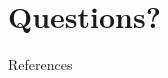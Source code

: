 \documentclass{beamer}
\begin{document}
\appendix
\section{Questions?}
\begin{frame}
\sectionpage
\end{frame}

\begin{frame}[allowframebreaks]{References}
\def\newblock{}
\nocite{*}
\scriptsize{}

\end{frame}
\end{document}
